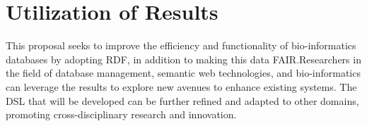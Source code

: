 \section{Utilization of Results}

This proposal seeks to improve the efficiency and functionality of bio-informatics databases by adopting RDF, in addition to making this data FAIR.\@  Researchers in the field of database management, semantic web technologies, and bio-informatics can leverage the results to explore new avenues to enhance existing systems.  The DSL that will be developed can be further refined and adapted to other domains, promoting cross-disciplinary research and innovation.
